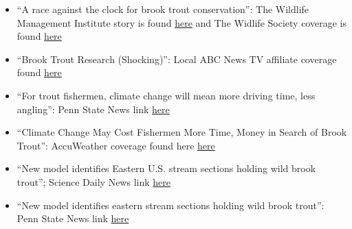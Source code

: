 \documentclass[10pt]{article}
\begin{document}
\begin{flushleft}
\begin{itemize}
\item ``A race against the clock for brook trout conservation'': The Wildlife Management Institute story is found \href{https://wildlifemanagement.institute/outdoor-news-bulletin/september-2016/race-against-clock-brook-trout-conservation}{here} and The Widlife Society coverage is found
\href{http://wildlife.org/a-race-against-the-clock-for-brook-trout-conservation/}{here}\\
\item ``Brook Trout Research (Shocking)'': Local ABC News TV affiliate coverage found \href{http://wnep.com/2016/09/25/brook-trout-research-shocking/}{here}\\
\item ``For trout fishermen, climate change will mean more driving time, less angling'': Penn State News link
\href{http://news.psu.edu/story/366131/2015/08/20/research/trout-fishermen-climate-change-will-mean-more-driving-time-less}{here}
\item ``Climate Change May Cost Fishermen More Time, Money in Search of Brook Trout'': AccuWeather coverage found here \href{http://www.accuweather.com/en/weather-news/climate-change-brook-trout-fisherman-high-cost/52151933}{here}\\

\item ``New model identifies Eastern U.S. stream sections holding wild brook trout''; Science Daily News link \href{http://www.sciencedaily.com/releases/2015/01/150106154610.htm}{here}\\
\item ``New model identifies eastern stream sections holding wild brook trout'': Penn State News link
\href{http://news.psu.edu/story/339640/2015/01/06/research/new-model-identifies-eastern-stream-sections-holding-wild-brook}{here}\\
\vspace{5pt}
\end{itemize}


\end{flushleft}
\end{document}
